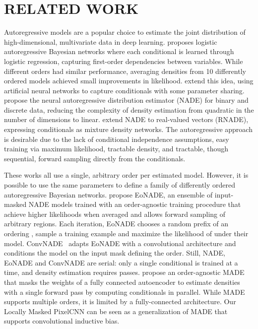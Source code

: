 \documentclass[letterpaper]{article}
\begin{document}
\section{RELATED WORK}
Autoregressive models are a popular choice to estimate the joint distribution of high-dimensional, multivariate data in deep learning. 
\cite{frey1998graphical} proposes logistic autoregressive Bayesian networks where each conditional is learned through logistic regression, capturing first-order dependencies between variables. While different orders had similar performance, averaging densities from 10 differently ordered models achieved small improvements in likelihood.
\cite{bengio2000modeling} extend this idea, using artificial neural networks to capture conditionals with some parameter sharing.
\cite{larochelle2011neural} propose the neural autoregressive distribution estimator (NADE) for binary and discrete data, reducing the complexity of density estimation from quadratic in the number of dimensions to linear. \cite{uria2013rnade} extend NADE to real-valued vectors (RNADE), expressing conditionals as mixture density networks. The autoregressive approach is desirable due to the lack of conditional independence assumptions, easy training via maximum likelihood, tractable density, and tractable, though sequential, forward sampling directly from the conditionals.

These works all use a single, arbitrary order per estimated model. However, it is possible to use the same parameters to define a family of differently ordered autoregressive Bayesian networks. \cite{uria2014deep} propose EoNADE, an ensemble of input-masked NADE models trained with an order-agnostic training procedure that achieve higher likelihoods when averaged and allows forward sampling of arbitrary regions. Each iteration, EoNADE chooses a random prefix of an ordering , sample a training example  and maximize the likelihood of  under their model. ConvNADE~\citep{JMLR:v17:16-272} adapts EoNADE with a convolutional architecture and conditions the model on the input mask defining the order. 
Still, NADE, EoNADE and ConvNADE are serial: only a single conditional is trained at a time, and density estimation requires  passes. \cite{germain2015made} propose an order-agnostic MADE that masks the weights of a fully connected autoencoder to estimate densities with a single forward pass by computing conditionals in parallel. While MADE supports multiple orders, it is limited by a fully-connected architecture. Our Locally Masked PixelCNN can be seen as a generalization of MADE that supports convolutional inductive bias.
\end{document}
